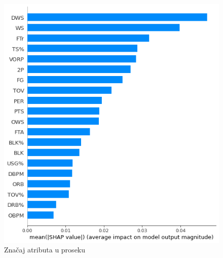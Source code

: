 \documentclass[a4paper]{article}
\begin{document}
\begin{figure}[h!]
\begin{center}
\includegraphics[scale=0.4]{shap_2.png}
\end{center}
\caption{Značaj atributa u proseku}
\label{plt:shap_2}
\end{figure}
\end{document}
